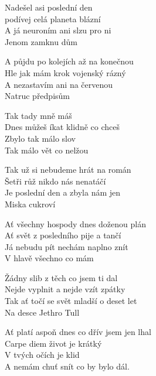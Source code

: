 
\ve{}
Nadešel asi poslední den\\
podívej celá planeta blázní\\
A já neuroním ani slzu pro ni\\
Jenom zamknu dům 

A půjdu po kolejích až na konečnou\\
Hle jak mám krok vojenský rázný\\
A nezastavím ani na červenou\\
Natruc předpisům

\cho{}
Tak tady mně máš \\
Dnes můžeš íkat klidně co chceš\\
Zbylo tak málo slov\\
Tak málo vět co nelžou

\ve{}
Tak už si nebudeme hrát na román\\
Šetři růž nikdo nás nenatáčí\\
Je poslední den a zbyla nám jen\\
Miska cukroví

Ať všechny hospody dnes doženou plán\\
Ať svět z posledního pije a tančí\\
Já nebudu pít nechám naplno znít\\
V hlavě všechno co mám

\cho{}

\ve{}
Žádny slib z těch co jsem ti dal\\
Nejde vyplnit a nejde vzít zpátky\\
Tak ať točí se svět mladší o deset let\\
Na desce Jethro Tull

Ať platí aspoň dnes co dřív jsem jen lhal\\
Carpe diem život je krátký\\
V tvých očích je klid\\
A nemám chuť snít co by bylo dál.

\cho{}

\esong